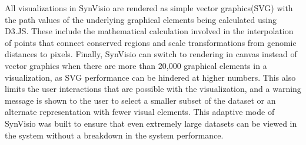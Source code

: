 All visualizations in SynVisio are rendered as simple vector graphics(SVG) with the path values of the underlying graphical elements being calculated using D3.JS. These include the mathematical calculation involved in the interpolation of points that connect conserved regions and scale transformations from genomic distances to pixels. Finally, SynVisio can switch to rendering in canvas instead of vector graphics when there are more than 20,000 graphical elements in a visualization, as SVG performance can be hindered at higher numbers. This also limits the user interactions that are possible with the visualization, and a warning message is shown to the user to select a smaller subset of the dataset or an alternate representation with fewer visual elements. This adaptive mode of SynVisio was built to ensure that even extremely large datasets can be viewed in the system without a breakdown in the system performance.

